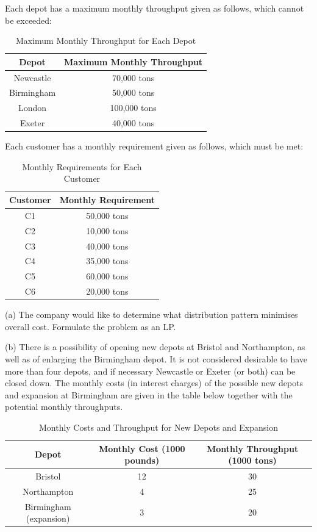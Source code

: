 \documentclass[a4paper,10pt]{article}
\begin{document}
Each depot has a maximum monthly throughput given as follows, which cannot be exceeded:
\begin{table}[H]
\centering
\begin{tabular}{|c|c|}
\hline
Depot & Maximum Monthly Throughput \\
\hline
Newcastle & 70,000 tons \\
Birmingham & 50,000 tons \\
London & 100,000 tons \\
Exeter & 40,000 tons \\
\hline
\end{tabular}
\caption{Maximum Monthly Throughput for Each Depot}
\end{table}

Each customer has a monthly requirement given as follows, which must be met:
\begin{table}[H]
\centering
\begin{tabular}{|c|c|}
\hline
Customer & Monthly Requirement \\ 
\hline
C1 & 50,000 tons \\ 
C2 & 10,000 tons \\ 
C3 & 40,000 tons \\ 
C4 & 35,000 tons \\ 
C5 & 60,000 tons \\ 
C6 & 20,000 tons \\ 
\hline
\end{tabular}
\caption{Monthly Requirements for Each Customer}
\end{table}

(a) The company would like to determine what distribution pattern minimises overall cost.
Formulate the problem as an LP.

(b) There is a possibility of opening new depots at Bristol and Northampton, as well as of
enlarging the Birmingham depot.
It is not considered desirable to have more than four depots, and if necessary Newcastle or
Exeter (or both) can be closed down.
The monthly costs (in interest charges) of the possible new depots and expansion at Birmingham are given in the table below together with the potential monthly throughputs.
\begin{table}[H]
\centering
\begin{tabular}{|c|c|c|}
\hline
Depot & Monthly Cost (1000 pounds) & Monthly Throughput (1000 tons) \\ 
\hline
Bristol & 12 & 30 \\ 
Northampton & 4 & 25 \\ 
Birmingham (expansion) & 3 & 20 \\ 
\hline
\end{tabular}
\caption{Monthly Costs and Throughput for New Depots and Expansion}
\end{table}
\end{document}

